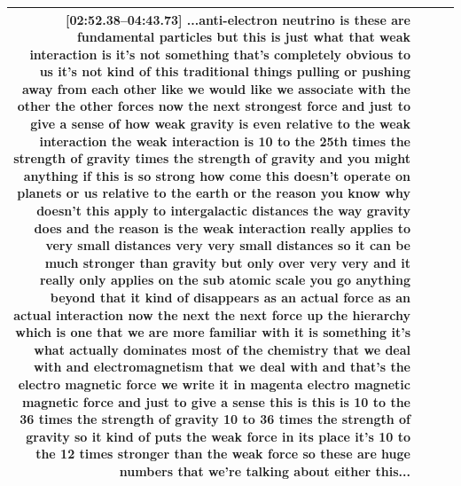 \documentclass[10pt]{article}
\begin{document}
\begin{tiny}
\begin{longtable}{|r|p{0.375in}|p{1.275in}|p{3.5in}|}
                                                                                                                                                                                                                   \textbf{[02:52.38--04:43.73]} ...anti-electron neutrino is these are fundamental particles but this is just what that weak interaction is it's not something that's completely obvious to us it's not kind of this traditional things pulling or pushing away from each other like we would like we associate with the other the other forces now the next strongest force and just to give a sense of how weak gravity is even relative to the weak interaction the weak interaction is 10 to the 25th times the strength of gravity times the strength of gravity and you might anything if this is so strong how come this doesn't operate on planets or us relative to the earth or the reason you know why doesn't this apply to intergalactic distances the way gravity does and the reason is the weak interaction really applies to very small distances very very small distances so it can be much stronger than gravity but only over very very and it really only applies on the sub atomic scale you go anything beyond that it kind of disappears as an actual force as an actual interaction now the next the next force up the hierarchy which is one that we are more familiar with it is something it's what actually dominates most of the chemistry that we deal with and electromagnetism that we deal with and that's the electro magnetic force we write it in magenta electro magnetic magnetic force and just to give a sense this is this is 10 to the 36 times the strength of gravity 10 to 36 times the strength of gravity so it kind of puts the weak force in its place it's 10 to the 12 times stronger than the weak force so these are huge numbers that we're talking about either this... \\\hline

\end{longtable}
\end{tiny}
\end{document}
